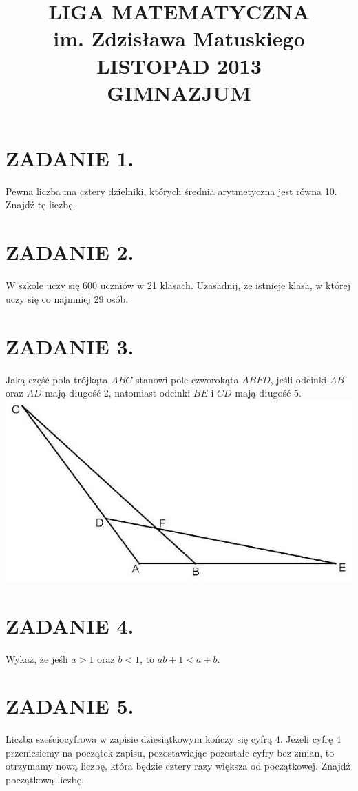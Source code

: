 \documentclass[10pt]{article}
\title{LIGA MATEMATYCZNA \\
 im. Zdzisława Matuskiego \\
 LISTOPAD 2013 \\
 GIMNAZJUM }
\author{}
\date{}
\begin{document}
\maketitle
\section*{ZADANIE 1.}
Pewna liczba ma cztery dzielniki, których średnia arytmetyczna jest równa 10. Znajdź tę liczbę.

\section*{ZADANIE 2.}
W szkole uczy się 600 uczniów w 21 klasach. Uzasadnij, że istnieje klasa, w której uczy się co najmniej 29 osób.

\section*{ZADANIE 3.}
Jaką część pola trójkąta \(A B C\) stanowi pole czworokąta \(A B F D\), jeśli odcinki \(A B\) oraz \(A D\) mają długość 2, natomiast odcinki \(B E\) i \(C D\) mają długość 5.\\
\includegraphics[max width=\textwidth, center]{2024_11_21_d1fc04d5087b037befedg-1}

\section*{ZADANIE 4.}
Wykaż, że jeśli \(a>1\) oraz \(b<1\), to \(a b+1<a+b\).

\section*{ZADANIE 5.}
Liczba sześciocyfrowa w zapisie dziesiątkowym kończy się cyfrą 4. Jeżeli cyfrę 4 przeniesiemy na początek zapisu, pozostawiając pozostałe cyfry bez zmian, to otrzymamy nową liczbę, która będzie cztery razy większa od początkowej. Znajdź początkową liczbę.
\end{document}

